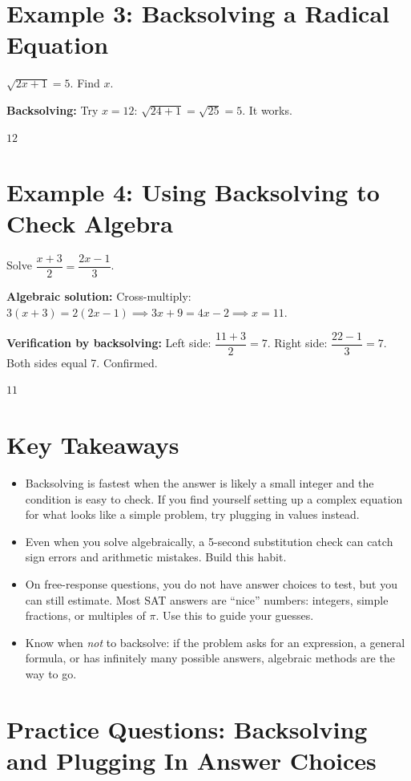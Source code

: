 \documentclass[14pt]{extarticle}
\begin{document}
\section*{Example 3: Backsolving a Radical Equation}

\(\sqrt{2x + 1} = 5\). Find \(x\).

\textbf{Backsolving:} Try \(x = 12\): \(\sqrt{24 + 1} = \sqrt{25} = 5\). It works.

\(\boxed{12}\)

\section*{Example 4: Using Backsolving to Check Algebra}

Solve \(\dfrac{x + 3}{2} = \dfrac{2x - 1}{3}\).

\textbf{Algebraic solution:} Cross-multiply: \(3(x + 3) = 2(2x - 1) \implies 3x + 9 = 4x - 2 \implies x = 11\).

\textbf{Verification by backsolving:} Left side: \(\dfrac{11 + 3}{2} = 7\). Right side: \(\dfrac{22 - 1}{3} = 7\). Both sides equal 7. Confirmed.

\(\boxed{11}\)

\section*{Key Takeaways}
\begin{itemize}
  \item Backsolving is fastest when the answer is likely a small integer and the condition is easy to check. If you find yourself setting up a complex equation for what looks like a simple problem, try plugging in values instead.
  \item Even when you solve algebraically, a 5-second substitution check can catch sign errors and arithmetic mistakes. Build this habit.
  \item On free-response questions, you do not have answer choices to test, but you can still estimate. Most SAT answers are ``nice'' numbers: integers, simple fractions, or multiples of \(\pi\). Use this to guide your guesses.
  \item Know when \textit{not} to backsolve: if the problem asks for an expression, a general formula, or has infinitely many possible answers, algebraic methods are the way to go.
\end{itemize}

\newpage

\section*{Practice Questions: Backsolving and Plugging In Answer Choices}
\end{document}
